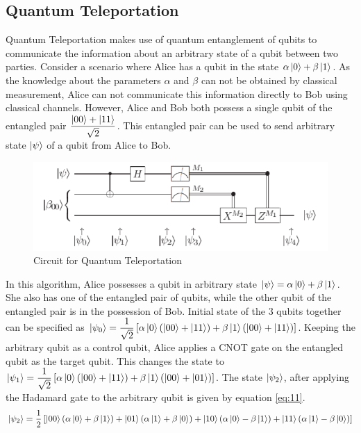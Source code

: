 \documentclass[english,a4paper,11pt,oneside,onecolumn]{book}
\begin{document}
\subsection{Quantum Teleportation}
\label{sec:qTele}
Quantum Teleportation makes use of quantum entanglement of qubits to communicate the information about an arbitrary state of a qubit between two parties. Consider a scenario where Alice has a qubit in the state \(\alpha\ket{0} + \beta\ket{1}\). As the knowledge about the parameters \(\alpha\) and \(\beta\) can not be obtained by classical measurement, Alice can not communicate this information directly to Bob using classical channels. However, Alice and Bob both possess a single qubit of the entangled pair \(\dfrac{\ket{00} + \ket{11}}{\sqrt{2}}\). This entangled pair can be used to send arbitrary state \(\ket{\psi}\) of a qubit from Alice to Bob.
\begin{figure}[H]
    \centering
    \includegraphics[scale=0.7]{Images/quantumTeleport.png}
    \caption{Circuit for Quantum Teleportation \cite{nielsen_2019_quantum}}
    \label{fig:qTelePort}
\end{figure}
\noindent In this algorithm, Alice possesses a qubit in arbitrary state \(\ket{\psi}=\alpha\ket{0} + \beta\ket{1}\). She also has one of the entangled pair of qubits, while the other qubit of the entangled pair is in the possession of Bob. Initial state of the 3 qubits together can be specified as \(\ket{\psi_0}=\dfrac{1}{\sqrt{2}}\left[\alpha\ket{0}\left(\ket{00}+\ket{11}\right)+\beta\ket{1}\left(\ket{00}+\ket{11}\right)\right]\). Keeping the arbitrary qubit as a control qubit, Alice applies a CNOT gate on the entangled qubit as the target qubit. This changes the state to \(\ket{\psi_1}=\dfrac{1}{\sqrt{2}}\left[\alpha\ket{0}\left(\ket{00}+\ket{11}\right)+\beta\ket{1}\left(\ket{00}+\ket{01}\right)\right]\). The state \(\ket{\psi_2}\), after applying the Hadamard gate to the arbitrary qubit is given by equation \ref{eq:11}.
\begin{equation}\label{eq:11}
\ket{\psi_2}=\dfrac{1}{2}\left[\ket{00}\left(\alpha\ket{0}+\beta\ket{1}\right)+\ket{01}\left(\alpha\ket{1}+\beta\ket{0}\right)+\ket{10}\left(\alpha\ket{0}-\beta\ket{1}\right)+\ket{11}\left(\alpha\ket{1}-\beta\ket{0}\right)\right]
\end{equation}
\end{document}
